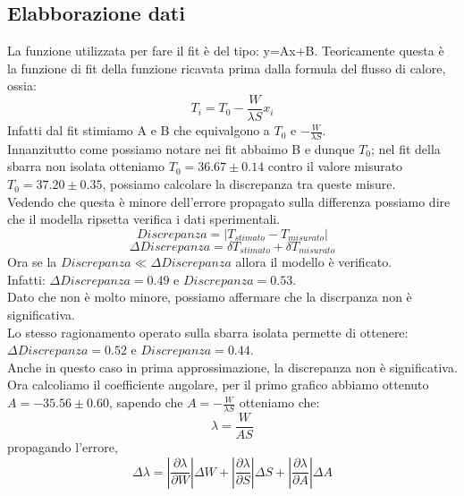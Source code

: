 \documentclass[a4paper,10pt]{article}
\begin{document}
\subsection{Elabborazione dati}
La funzione utilizzata per fare il fit è del tipo: y=Ax+B. Teoricamente questa è la funzione di fit della funzione ricavata prima dalla formula del flusso di calore, ossia:
\begin{equation}
 T_i=T_0-\frac{W}{\lambda S}x_i
\end{equation}
Infatti dal fit stimiamo A e B che equivalgono a $T_0$ e $-\frac{W}{\lambda S}$.\\
Innanzitutto come possiamo notare nei fit abbaimo B e dunque $T_0$; nel fit della sbarra non isolata otteniamo $T_0=36.67\pm0.14$ contro il valore misurato $T_0=37.20\pm0.35$,
possiamo calcolare la discrepanza tra queste misure.\\
Vedendo che questa è minore dell'errore propagato sulla differenza possiamo dire che il modella ripsetta verifica i dati sperimentali.
\begin{equation}
 Discrepanza=\left | T_{stimato}-T_{misurato} \right |
\end{equation}
\begin{equation}
 \Delta Discrepanza=\delta T_{stimato} + \delta T_{misurato}
\end{equation}
Ora se la $Discrepanza\ll\Delta Discrepanza$ allora il modello è verificato.\\
Infatti: $\Delta Discrepanza= 0.49$ e $Discrepanza=0.53$.\\
Dato che non è molto minore, possiamo affermare che la discrpanza non è significativa.\\
Lo stesso ragionamento operato sulla sbarra isolata permette di ottenere:\\
$\Delta Discrepanza=0.52$ e $Discrepanza=0.44$.\\
Anche in questo caso in prima approssimazione, la discrepanza non è significativa.
Ora calcoliamo il coefficiente angolare, per il primo grafico abbiamo ottenuto $A=-35.56\pm0.60$, sapendo che $A=-\frac{W}{\lambda S}$ otteniamo che:\\
\begin{displaymath}
 \lambda=\frac{W}{AS}
\end{displaymath}
propagando l'errore,
\begin{displaymath}
 \Delta \lambda=\left | \frac{\partial\lambda}{\partial W} \right | \Delta W + \left | \frac{\partial\lambda}{\partial S} \right | \Delta S +  \left | \frac{\partial\lambda}{\partial A} \right | \Delta A
\end{displaymath}
\end{document}
